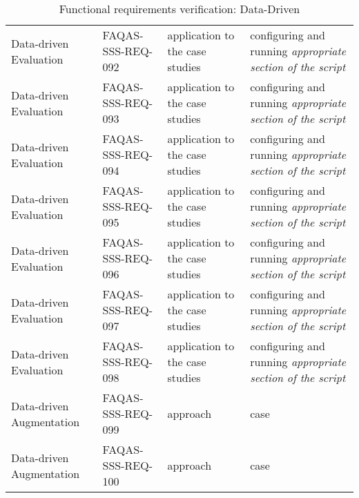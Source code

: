\begin{table}[H]
{\begin{tabular}{|l|l|l|l|}
Data-driven Evaluation & FAQAS-SSS-REQ-092 & application to the case studies & configuring and running \emph{appropriate section of the script} \\
Data-driven Evaluation & FAQAS-SSS-REQ-093 & application to the case studies & configuring and running \emph{appropriate section of the script} \\
Data-driven Evaluation & FAQAS-SSS-REQ-094 & application to the case studies & configuring and running \emph{appropriate section of the script} \\
Data-driven Evaluation & FAQAS-SSS-REQ-095 & application to the case studies & configuring and running \emph{appropriate section of the script} \\
Data-driven Evaluation & FAQAS-SSS-REQ-096 & application to the case studies & configuring and running \emph{appropriate section of the script} \\
Data-driven Evaluation & FAQAS-SSS-REQ-097 & application to the case studies & configuring and running \emph{appropriate section of the script} \\
Data-driven Evaluation & FAQAS-SSS-REQ-098 & application to the case studies & configuring and running \emph{appropriate section of the script} \\
Data-driven Augmentation & FAQAS-SSS-REQ-099 & approach & case \\
Data-driven Augmentation & FAQAS-SSS-REQ-100 & approach & case \\
\hline
\end{tabular}
  }
\caption{Functional requirements verification: Data-Driven}
\label{tables:data}
\end{table}
